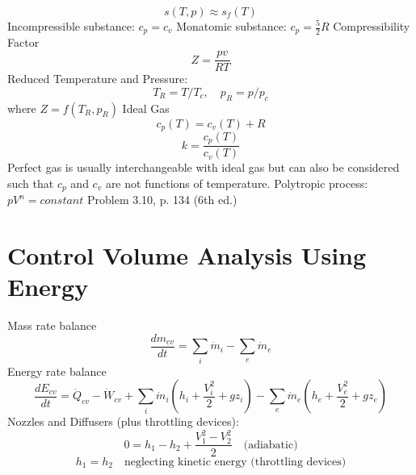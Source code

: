 \documentclass[paper=letter, fontsize=11pt]{scrartcl}
\numberwithin{equation}{section}        %
\numberwithin{figure}{section}          %
\numberwithin{table}{section}               %
\begin{document}
\begin{equation}
    s(T,p)\approx s_f(T)
\end{equation}
\newline
\newline
Incompressible substance: $c_p=c_v$
\newline
\newline
Monatomic substance: $c_p=\frac{5}{2}R$
\newline
\newline
Compressibility Factor
\begin{equation}
    Z = \frac{pv}{RT}
\end{equation}
\newline
\newline
Reduced Temperature and Pressure:
\begin{equation}
    T_R = T/T_c,\quad p_R = p/p_c
\end{equation}
where $Z=f(T_R,p_R)$
\newline
\newline
Ideal Gas
\begin{equation}
    c_p(T) = c_v(T)+R
\end{equation}
\begin{equation}
    k = \frac{c_p(T)}{c_v(T)}
\end{equation}
\newline
\newline
Perfect gas is usually interchangeable with ideal gas but can also be considered such that $c_p$ and $c_v$ are not functions of temperature.
\newline
\newline
Polytropic process: $pV^n=constant$
\newline
\newline
Problem 3.10, p. 134 (6th ed.)


\newpage
\section{Control Volume Analysis Using Energy}

Mass rate balance
\begin{equation}
    \frac{dm_{cv}}{dt} = \sum_i \dot m_i - \sum_e \dot m_e
\end{equation}
\newline
\newline
Energy rate balance
\begin{equation}
    \frac{dE_{cv}}{dt} = \dot Q_{cv} -  \dot W_{cv} + \sum_i \dot m_i \left(h_i + \frac{V_i^2}{2} + gz_i \right) - \sum_e \dot m_e \left(h_e + \frac{V_e^2}{2} + gz_e \right) 
\end{equation}
\newline
\newline
Nozzles and Diffusers (plus throttling devices):
\begin{equation}
    0 = h_1 - h_2 + \frac{V_1^2 - V_2^2}{2}\quad\text{(adiabatic)}
\end{equation}
\begin{equation}
    h_1 = h_2\quad\text{neglecting kinetic energy (throttling devices)}
\end{equation}
\end{document}
